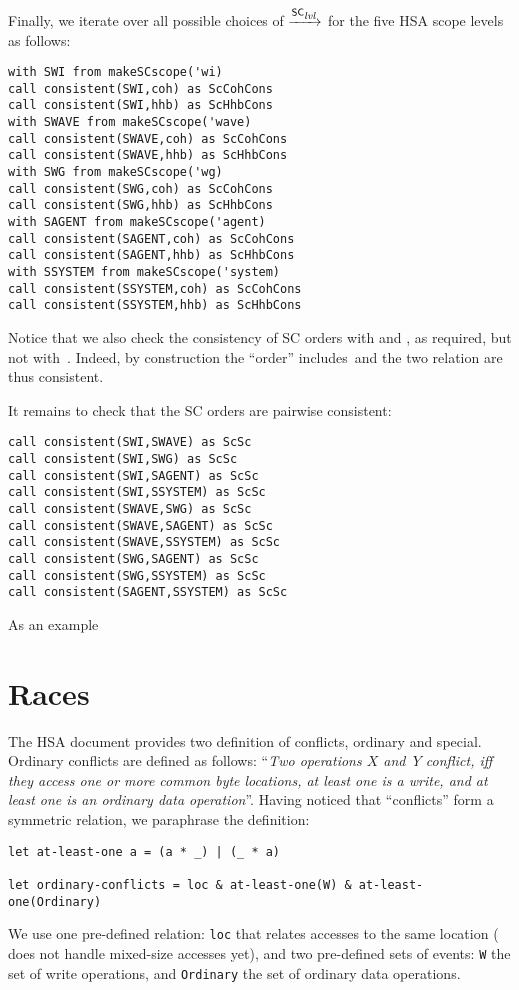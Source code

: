 \documentclass[a4paper]{article}
\begin{document}
Finally, we iterate over all possible choices of $\xrightarrow{\textsf{\scriptsize{}SC$_{\textsf{\scriptsize{}{\it\scriptsize{}lvl}}}$}}$ for the five
HSA scope levels as follows:
\begin{verbatim}
with SWI from makeSCscope('wi)
call consistent(SWI,coh) as ScCohCons
call consistent(SWI,hhb) as ScHhbCons
with SWAVE from makeSCscope('wave)
call consistent(SWAVE,coh) as ScCohCons
call consistent(SWAVE,hhb) as ScHhbCons
with SWG from makeSCscope('wg)
call consistent(SWG,coh) as ScCohCons
call consistent(SWG,hhb) as ScHhbCons
with SAGENT from makeSCscope('agent)
call consistent(SAGENT,coh) as ScCohCons
call consistent(SAGENT,hhb) as ScHhbCons
with SSYSTEM from makeSCscope('system)
call consistent(SSYSTEM,coh) as ScCohCons
call consistent(SSYSTEM,hhb) as ScHhbCons
\end{verbatim}
Notice that we also check the consistency of SC orders with \coh{} and \hhb{},
as required, but not with~\po{}.
Indeed, by construction the ``order''  includes~\po and
the two relation are thus consistent.

It remains to check that the SC orders are pairwise consistent:
\begin{verbatim}
call consistent(SWI,SWAVE) as ScSc
call consistent(SWI,SWG) as ScSc
call consistent(SWI,SAGENT) as ScSc
call consistent(SWI,SSYSTEM) as ScSc
call consistent(SWAVE,SWG) as ScSc
call consistent(SWAVE,SAGENT) as ScSc
call consistent(SWAVE,SSYSTEM) as ScSc
call consistent(SWG,SAGENT) as ScSc
call consistent(SWG,SSYSTEM) as ScSc
call consistent(SAGENT,SSYSTEM) as ScSc
\end{verbatim}
As an example

\section{Races}
The HSA document provides two definition of conflicts, ordinary
and special.
Ordinary conflicts are defined as follows:
``\emph{Two operations $X$ and~$Y$ conflict, iff they access one or
more common byte locations, at least one is a write, and at least one is
an ordinary data operation}''.
Having noticed that ``conflicts'' form a symmetric relation, we paraphrase
the definition:
\begin{verbatim}
let at-least-one a = (a * _) | (_ * a)

let ordinary-conflicts = loc & at-least-one(W) & at-least-one(Ordinary)
\end{verbatim}
We use one pre-defined relation:
\verb+loc+ that relates accesses to the same location
(\herd{} does not handle mixed-size accesses yet),
and two pre-defined sets of events:
\verb+W+ the set of write operations, and \verb+Ordinary+ the set of
ordinary data operations.
\end{document}

